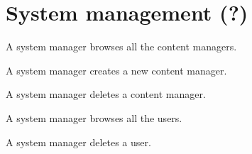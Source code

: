 \section{System management (?)}
\label{Appendix_OUC_SM}
\begin{my_itemize}
\item A system manager browses all the content managers.
\item A system manager creates a new content manager.
\item A system manager deletes a content manager.
\item A system manager browses all the users.
\item A system manager deletes a user.
\end{my_itemize}
